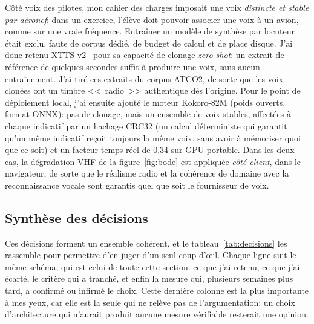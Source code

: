 \documentclass[11pt,a4paper]{article}
\begin{document}
Côté voix des pilotes, mon cahier des charges imposait une voix \emph{distincte et stable par aéronef}: dans un exercice, l'élève doit pouvoir associer une voix à un avion, comme sur une vraie fréquence. Entraîner un modèle de synthèse par locuteur était exclu, faute de corpus dédié, de budget de calcul et de place disque. J'ai donc retenu XTTS-v2~\cite{xtts} pour sa capacité de clonage \emph{zero-shot}: un extrait de référence de quelques secondes suffit à produire une voix, sans aucun entraînement. J'ai tiré ces extraits du corpus ATCO2, de sorte que les voix clonées ont un timbre <<~radio~>> authentique dès l'origine. Pour le point de déploiement local, j'ai ensuite ajouté le moteur Kokoro-82M (poids ouverts, format ONNX): pas de clonage, mais un ensemble de voix stables, affectées à chaque indicatif par un hachage CRC32 (un calcul déterministe qui garantit qu'un même indicatif reçoit toujours la même voix, sans avoir à mémoriser quoi que ce soit) et un facteur temps réel de 0,34 sur GPU portable. Dans les deux cas, la dégradation VHF de la figure~\ref{fig:bode} est appliquée \emph{côté client}, dans le navigateur, de sorte que le réalisme radio et la cohérence de domaine avec la reconnaissance vocale sont garantis quel que soit le fournisseur de voix. 

\subsection{Synthèse des décisions}

Ces décisions forment un ensemble cohérent, et le tableau~\ref{tab:decisions} les rassemble pour permettre d'en juger d'un seul coup d'\oe il. Chaque ligne suit le même schéma, qui est celui de toute cette section: ce que j'ai retenu, ce que j'ai écarté, le critère qui a tranché, et enfin la mesure qui, plusieurs semaines plus tard, a confirmé ou infirmé le choix. Cette dernière colonne est la plus importante à mes yeux, car elle est la seule qui ne relève pas de l'argumentation: un choix d'architecture qui n'aurait produit aucune mesure vérifiable resterait une opinion.
\end{document}
